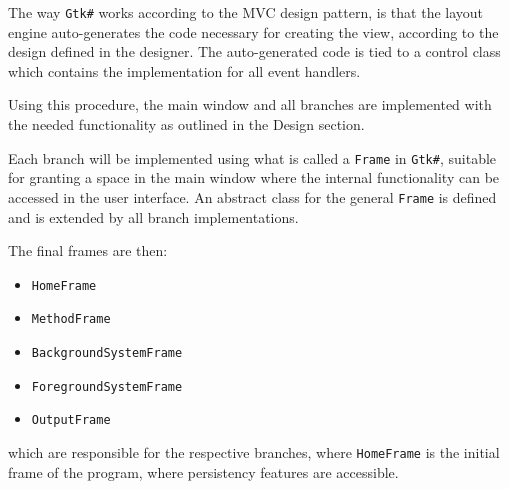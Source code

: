 The way \texttt{Gtk\#} works according to the MVC design pattern, is that the layout engine auto-generates the code necessary for creating the view, according to the design defined in the designer. The auto-generated code is tied to a control class which contains the implementation for all event handlers. 

Using this procedure, the main window and all branches are implemented with the needed functionality as outlined in the Design section. 

Each branch will be implemented using what is called a \texttt{Frame} in \texttt{Gtk\#}, suitable for granting a space in the main window where the internal functionality can be accessed in the user interface. An abstract class for the general \texttt{Frame} is defined and is extended by all branch implementations.

The final frames are then:
\begin{itemize}
    \item \texttt{HomeFrame}
    \item \texttt{MethodFrame}
    \item \texttt{BackgroundSystemFrame}
    \item \texttt{ForegroundSystemFrame}
    \item \texttt{OutputFrame}
\end{itemize}

which are responsible for the respective branches, where \texttt{HomeFrame} is the initial frame of the program, where persistency features are accessible.
